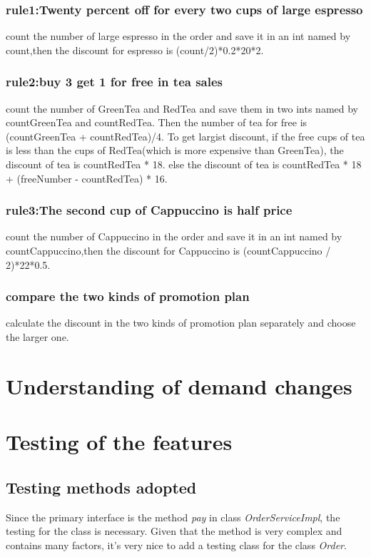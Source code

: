 \documentclass[a4paper]{report}
\begin{document}
\subsection{rule1:Twenty percent off for every two cups of large espresso}
count the number of large espresso in the order and save it in an int named by count,then the discount for espresso is (count/2)*0.2*20*2.
\subsection{rule2:buy 3 get 1 for free in tea sales}
count the number of GreenTea and RedTea and  save them in two ints named by countGreenTea and countRedTea.
Then the number of tea for free is (countGreenTea + countRedTea)/4.
To get largist discount, if the free cups of tea is less than the cups of RedTea(which is more expensive than GreenTea),
the discount of tea is countRedTea * 18. else the discount of tea is countRedTea * 18 + (freeNumber - countRedTea) * 16.
\subsection{rule3:The second cup of Cappuccino is half price}
count the number of Cappuccino in the order and save it in an int named by countCappuccino,then the discount for Cappuccino is (countCappuccino / 2)*22*0.5.
\subsection{compare the two kinds of promotion plan}
calculate the discount in the two kinds of promotion plan separately and choose the larger one.


\chapter{Understanding of demand changes}
\chapter{Testing of the features}
\section{Testing methods adopted}
Since the primary interface is the method \emph{pay} in class \emph{OrderServiceImpl}, the testing for the class is necessary. Given that the method is very complex and contains many factors, it's very nice to add a testing class for the class \emph{Order}.
\end{document}
